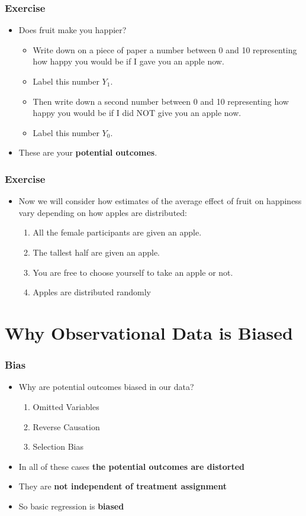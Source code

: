 \documentclass[xcolor=x11names,compress]{beamer}\usepackage[]{graphicx}\usepackage[]{color}
\renewcommand{\(}{\begin{columns}}
\renewcommand{\)}{\end{columns}}
\newcommand{\<}[1]{\begin{column}{#1}}
\renewcommand{\>}{\end{column}}
\begin{document}
\begin{frame}
\frametitle{Exercise}
\begin{itemize}
\item Does fruit make you happier? 
\pause
\begin{itemize}
\item Write down on a piece of paper a number between 0 and 10 representing how happy you would be if I gave you an apple now. 
\pause
\item Label this number $Y_1$.
\pause
\item Then write down a second number between 0 and 10 representing how happy you would be if I did NOT give you an apple now. 
\pause
\item Label this number $Y_0$.
\pause
\end{itemize}
\item These are your \textbf{potential outcomes}.
\end{itemize}
\end{frame}

\begin{frame}
\frametitle{Exercise}
\begin{itemize}
\item Now we will consider how estimates of the average effect of fruit on happiness vary depending on how apples are distributed:
\pause
\begin{enumerate}
\item All the female participants are given an apple.
\pause
\item The tallest half are given an apple.
\pause
\item You are free to choose yourself to take an apple or not.
\pause
\item Apples are distributed randomly
\end{enumerate}
\end{itemize}
\end{frame}



\section{Why Observational Data is Biased}

\begin{frame}
\frametitle{Bias}
\begin{itemize}
\item Why are potential outcomes biased in our data?
\pause
\begin{enumerate}
\item Omitted Variables
\pause
\item Reverse Causation
\pause
\item Selection Bias
\pause
\end{enumerate}
\item In all of these cases \textbf{the potential outcomes are distorted}
\pause
\item They are \textbf{not independent of treatment assignment}
\pause
\item So basic regression is \textbf{biased}
\end{itemize}
\end{frame}
\end{document}
